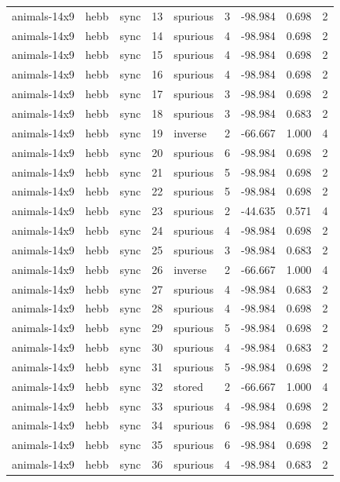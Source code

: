 \begin{tabular}{lllrlrrrr}
animals-14x9 & hebb & sync & 13 & spurious & 3 & -98.984 & 0.698 & 2 \\
animals-14x9 & hebb & sync & 14 & spurious & 4 & -98.984 & 0.698 & 2 \\
animals-14x9 & hebb & sync & 15 & spurious & 4 & -98.984 & 0.698 & 2 \\
animals-14x9 & hebb & sync & 16 & spurious & 4 & -98.984 & 0.698 & 2 \\
animals-14x9 & hebb & sync & 17 & spurious & 3 & -98.984 & 0.698 & 2 \\
animals-14x9 & hebb & sync & 18 & spurious & 3 & -98.984 & 0.683 & 2 \\
animals-14x9 & hebb & sync & 19 & inverse & 2 & -66.667 & 1.000 & 4 \\
animals-14x9 & hebb & sync & 20 & spurious & 6 & -98.984 & 0.698 & 2 \\
animals-14x9 & hebb & sync & 21 & spurious & 5 & -98.984 & 0.698 & 2 \\
animals-14x9 & hebb & sync & 22 & spurious & 5 & -98.984 & 0.698 & 2 \\
animals-14x9 & hebb & sync & 23 & spurious & 2 & -44.635 & 0.571 & 4 \\
animals-14x9 & hebb & sync & 24 & spurious & 4 & -98.984 & 0.698 & 2 \\
animals-14x9 & hebb & sync & 25 & spurious & 3 & -98.984 & 0.683 & 2 \\
animals-14x9 & hebb & sync & 26 & inverse & 2 & -66.667 & 1.000 & 4 \\
animals-14x9 & hebb & sync & 27 & spurious & 4 & -98.984 & 0.683 & 2 \\
animals-14x9 & hebb & sync & 28 & spurious & 4 & -98.984 & 0.698 & 2 \\
animals-14x9 & hebb & sync & 29 & spurious & 5 & -98.984 & 0.698 & 2 \\
animals-14x9 & hebb & sync & 30 & spurious & 4 & -98.984 & 0.683 & 2 \\
animals-14x9 & hebb & sync & 31 & spurious & 5 & -98.984 & 0.698 & 2 \\
animals-14x9 & hebb & sync & 32 & stored & 2 & -66.667 & 1.000 & 4 \\
animals-14x9 & hebb & sync & 33 & spurious & 4 & -98.984 & 0.698 & 2 \\
animals-14x9 & hebb & sync & 34 & spurious & 6 & -98.984 & 0.698 & 2 \\
animals-14x9 & hebb & sync & 35 & spurious & 6 & -98.984 & 0.698 & 2 \\
animals-14x9 & hebb & sync & 36 & spurious & 4 & -98.984 & 0.683 & 2 \\

\end{tabular}
